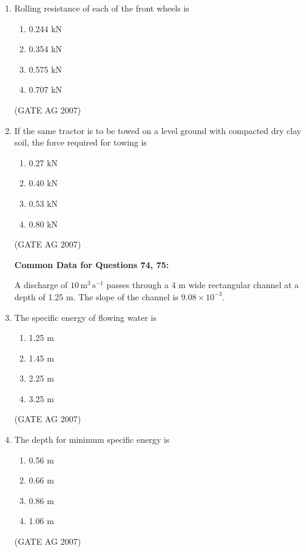 \documentclass[journal,12pt,onecolumn]{IEEEtran}
\theoremstyle{remark}
\begin{document}
\begin{enumerate}[label=Q\arabic*:]
\item Rolling resistance of each of the front wheels is
\begin{multicols}{4}
\begin{enumerate}
    \item 0.244 kN
    \item 0.354 kN
    \item 0.575 kN
    \item 0.707 kN
\end{enumerate}
\end{multicols}
\hfill(GATE AG 2007)

\item If the same tractor is to be towed on a level ground with compacted dry clay soil, the force required for towing is
\begin{multicols}{4}
\begin{enumerate}
    \item 0.27 kN
    \item 0.40 kN
    \item 0.53 kN
    \item 0.80 kN
\end{enumerate}
\end{multicols}
\hfill(GATE AG 2007)

\textbf{Common Data for Questions 74, 75:}


A discharge of $10 \, \text{m}^3 \, \text{s}^{-1}$ passes through a 4 m wide rectangular channel at a depth of 1.25 m. The slope of the channel is $9.08 \times 10^{-3}$.


\item The specific energy of flowing water is
\begin{multicols}{4}
\begin{enumerate}
\item 1.25 m
\item 1.45 m
\item 2.25 m
\item 3.25 m
\end{enumerate}
\end{multicols}
\hfill(GATE AG 2007)

\item The depth for minimum specific energy is
\begin{multicols}{4}
\begin{enumerate}
\item 0.56 m
\item 0.66 m
\item 0.86 m
\item 1.06 m
\end{enumerate}
\end{multicols}
\hfill(GATE AG 2007)
 

\end{enumerate}
\end{document}
